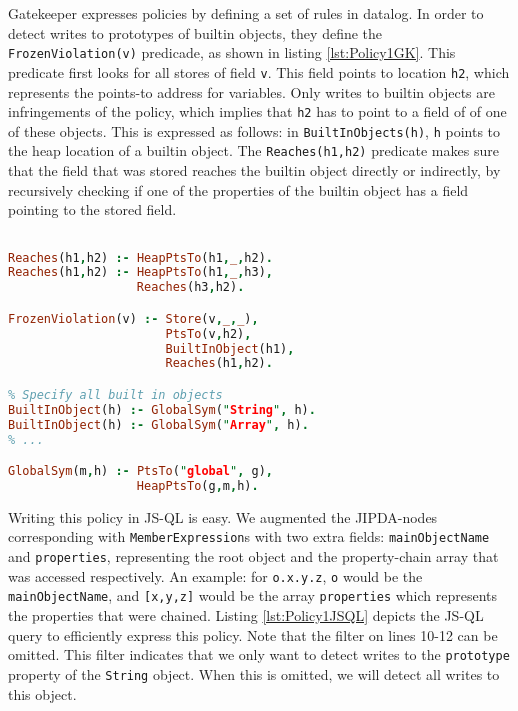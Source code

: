Gatekeeper expresses policies by defining a set of rules in datalog. In order to detect writes to prototypes of builtin objects, they define the \texttt{FrozenViolation(v)} predicade, as shown in listing \ref{lst:Policy1GK}. This predicate first looks for all stores of field \texttt{v}. This field points to location \texttt{h2}, which represents the points-to address for variables. Only writes to builtin objects are infringements of the policy, which implies that \texttt{h2} has to point to a field of of one of these objects. This is expressed as follows: in \texttt{BuiltInObjects(h)}, \texttt{h} points to the heap location of a builtin object. The \texttt{Reaches(h1,h2)} predicate makes sure that the field that was stored reaches the builtin object directly or indirectly, by recursively checking if one of the properties of the builtin object has a field pointing to the stored field.

\begin{lstlisting}[label={lst:Policy1GK},language=Prolog,caption=Policy 1 in GateKeeper,mathescape=true]  % float=t?

Reaches(h1,h2) :- HeapPtsTo(h1,_,h2).
Reaches(h1,h2) :- HeapPtsTo(h1,_,h3),
                  Reaches(h3,h2).

FrozenViolation(v) :- Store(v,_,_),
                      PtsTo(v,h2),
                      BuiltInObject(h1),
                      Reaches(h1,h2).

% Specify all built in objects
BuiltInObject(h) :- GlobalSym("String", h).
BuiltInObject(h) :- GlobalSym("Array", h).
% ...

GlobalSym(m,h) :- PtsTo("global", g),
                  HeapPtsTo(g,m,h).

\end{lstlisting}

Writing this policy in JS-QL is easy. We augmented the JIPDA-nodes corresponding with \texttt{MemberExpression}s with two extra fields: \texttt{mainObjectName} and \texttt{properties}, representing the root object and the property-chain array that was accessed respectively. An example: for \texttt{o.x.y.z}, \texttt{o} would be the \texttt{mainObjectName}, and \texttt{[x,y,z]} would be the array \texttt{properties} which represents the properties that were chained. Listing \ref{lst:Policy1JSQL} depicts the JS-QL query to efficiently express this policy. Note that the filter on lines 10-12 can be omitted. This filter indicates that we only want to detect writes to the \texttt{prototype} property of the \texttt{String} object. When this is omitted, we will detect all writes to this object.

